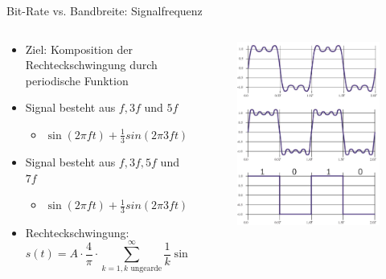 \documentclass[12pt%
,aspectratio=169%
]{beamer}
\begin{document}
\begin{frame}{Bit-Rate vs. Bandbreite: Signalfrequenz}
\begin{columns}[T] %
\begin{column}{.6\textwidth}
\vspace*{-.7cm}
\begin{itemize}
	\item Ziel: Komposition der Rechteckschwingung durch periodische Funktion
	\item Signal besteht aus $f, 3f$ und $5f$
	\begin{itemize}
		\item $\sin(2\pi f t) + \frac{1}{3} sin(2 \pi 3 f t) + \frac{1}{5} sin(2 \pi 5 f t)$
	\end{itemize}
	\item Signal besteht aus $f, 3f, 5f$ und $7f$
	\begin{itemize}
		\item $\sin(2\pi f t) + \frac{1}{3} sin(2 \pi 3 f t) + \frac{1}{5} sin(2 \pi 5 f t) + \frac{1}{7} sin(2 \pi 7 f t)$
	\end{itemize}
	\item Rechteckschwingung:
	$$ s(t) = A \cdot \frac{4}{\pi} \cdot \sum_{k=1, k \text{ ungearde}}^\infty \frac{1}{k} \sin(2 \pi k f t) $$
\end{itemize}
\end{column}%
\hfill%
\begin{column}{.4\textwidth}
\vspace*{-.7cm}
\begin{figure}
\centering
\includegraphics[scale=0.25]{pictures/sf}
\end{figure}
\end{column}%
\end{columns}
\end{frame}
\end{document}
